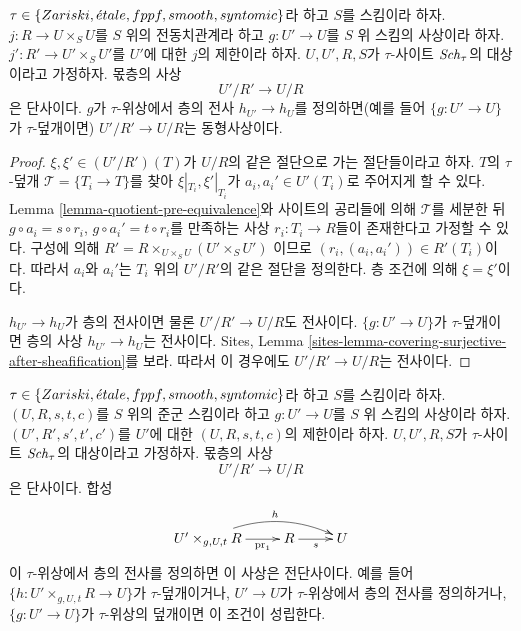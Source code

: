 \begin{lemma}
\label{lemma-quotient-pre-equivalence-relation-restrict}
$\tau \in \{Zariski, {\acute{e}tale}, fppf, smooth, syntomic\}$라 하고 $S$를 스킴이라 하자.
$j : R \to U \times_S U$를 $S$ 위의 전동치관계라 하고 $g : U' \to U$를 $S$ 위 스킴의 사상이라 하자.
$j' : R' \to U' \times_S U'$를 $U'$에 대한 $j$의 제한이라 하자. $U, U', R, S$가 $\tau$-사이트
$\mathit{Sch}_\tau$의 대상이라고 가정하자. 몫층의 사상
$$
U'/R' \longrightarrow U/R
$$
은 단사이다. $g$가 $\tau$-위상에서 층의 전사 $h_{U'} \to h_U$를 정의하면(예를 들어
$\{g : U' \to U\}$가 $\tau$-덮개이면) $U'/R' \to U/R$는 동형사상이다.
\end{lemma}

\begin{proof}
$\xi, \xi' \in (U'/R')(T)$가 $U/R$의 같은 절단으로 가는 절단들이라고 하자. $T$의 $\tau$-덮개
$\mathcal{T} = \{T_i \to T\}$를 찾아 $\xi|_{T_i}, \xi'|_{T_i}$가 $a_i, a_i' \in U'(T_i)$로 주어지게 할 수 있다.
Lemma \ref{lemma-quotient-pre-equivalence}와 사이트의 공리들에 의해 $\mathcal{T}$를 세분한 뒤
$g \circ a_i = s \circ r_i$, $g \circ a_i' = t \circ r_i$를 만족하는 사상 $r_i : T_i \to R$들이 존재한다고
가정할 수 있다. 구성에 의해
$R' = R \times_{U \times_S U} (U' \times_S U')$
이므로 $(r_i, (a_i, a_i')) \in R'(T_i)$이다. 따라서 $a_i$와 $a_i'$는 $T_i$ 위의 $U'/R'$의 같은 절단을 정의한다.
층 조건에 의해 $\xi = \xi'$이다.

\medskip\noindent
$h_{U'} \to h_U$가 층의 전사이면 물론 $U'/R' \to U/R$도 전사이다. $\{g : U' \to U\}$가 $\tau$-덮개이면
층의 사상 $h_{U'} \to h_U$는 전사이다. Sites, Lemma
\ref{sites-lemma-covering-surjective-after-sheafification}를 보라. 따라서 이 경우에도 $U'/R' \to U/R$는 전사이다.
\end{proof}

\begin{lemma}
\label{lemma-quotient-groupoid-restrict}
$\tau \in \{Zariski, {\acute{e}tale}, fppf, smooth, syntomic\}$라 하고 $S$를 스킴이라 하자.
$(U, R, s, t, c)$를 $S$ 위의 준군 스킴이라 하고 $g : U' \to U$를 $S$ 위 스킴의 사상이라 하자.
$(U', R', s', t', c')$를 $U'$에 대한 $(U, R, s, t, c)$의 제한이라 하자. $U, U', R, S$가
$\tau$-사이트 $\mathit{Sch}_\tau$의 대상이라고 가정하자. 몫층의 사상
$$
U'/R' \longrightarrow U/R
$$
은 단사이다. 합성
$$
\xymatrix{
U' \times_{g, U, t} R \ar[r]_-{\text{pr}_1} \ar@/^3ex/[rr]^h
& R \ar[r]_s & U
}
$$
이 $\tau$-위상에서 층의 전사를 정의하면 이 사상은 전단사이다. 예를 들어
$\{h : U' \times_{g, U, t} R \to U\}$가 $\tau$-덮개이거나, $U' \to U$가 $\tau$-위상에서 층의 전사를
정의하거나, $\{g : U' \to U\}$가 $\tau$-위상의 덮개이면 이 조건이 성립한다.
\end{lemma}

